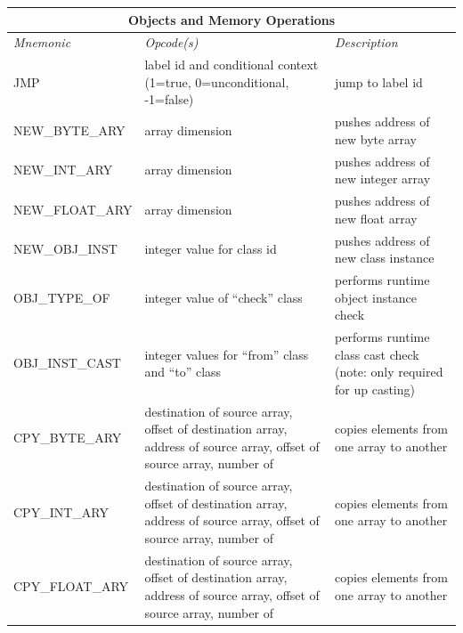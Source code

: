 \documentclass[11pt]{article}
\begin{document}
\begin{center}
  \vspace{\baselineskip}
  \begin{tabular}{| l | p{4 cm} | p{6 cm} |}
    \hline
    \multicolumn{3}{|c|}{\textbf{Objects and Memory Operations}} \\
    \hline
    \emph{Mnemonic}  &  \emph{Opcode(s)}  &  \emph{Description} \\ \hline \hline
    JMP & label id and conditional context (1=true, 0=unconditional, -1=false) & jump to label id \\ \hline
    NEW\_BYTE\_ARY & array dimension & pushes address of new byte array \\ \hline
    NEW\_INT\_ARY & array dimension & pushes address of new integer array \\ \hline
    NEW\_FLOAT\_ARY & array dimension & pushes address of new float array \\ \hline
    NEW\_OBJ\_INST & integer value for class id & pushes address of new class instance \\ \hline
    OBJ\_TYPE\_OF & integer value of ``check'' class & performs runtime object instance check \\ \hline
    OBJ\_INST\_CAST & integer values for ``from'' class and ``to''
    class & performs runtime class cast check (note: only required for
    up casting) \\ \hline
    CPY\_BYTE\_ARY & destination of source array, offset of destination array,
    address of source array, offset of source array, number of
    & copies elements from one array to another \\ \hline
    CPY\_INT\_ARY & destination of source array, offset of destination array,
    address of source array, offset of source array, number of
    & copies elements from one array to another \\ \hline
    CPY\_FLOAT\_ARY & destination of source array, offset of destination array,
    address of source array, offset of source array, number of
    & copies elements from one array to another \\ \hline
  \end{tabular}


\end{center}
\end{document}
